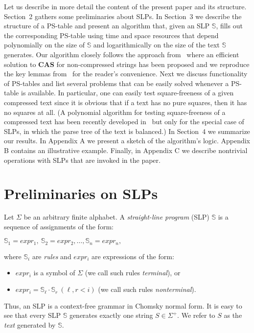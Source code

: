 \documentclass[11pt]{article}
\begin{document}
Let us describe in more detail the content of the present paper
and its structure. Section~2 gathers some preliminaries about
SLPs. In Section~3 we describe the structure of a PS-table and
present an algorithm that, given an SLP $\mathbb{S}$, fills out
the corresponding PS-table using time and space resources that
depend polynomially on the size of $\mathbb{S}$ and
logarithmically on the size of the text $\mathbb{S}$ generates.
Our algorithm closely follows the approach from~\cite{2} where an
efficient solution to {\bf CAS} for non-compressed strings has
been proposed and we reproduce the key lemmas from~\cite{2} for
the reader's convenience. Next we discuss functionality of
PS-tables and list several problems that can be easily solved
whenever a PS-table is available. In particular, one can easily
test square-freeness of a given compressed text since it is
obvious that if a text has no pure squares, then it has no squares
at all. (A polynomial algorithm for testing square-freeness of a
compressed text has been recently developed in~\cite{new} but only
for the special case of SLPs, in which the parse tree of the text
is balanced.) In Section~4 we summarize our results. In Appendix A
we present a sketch of the algorithm's logic. Appendix B contains
an illustrative example. Finally, in Appendix C we describe
nontrivial operations with SLPs that are invoked in the paper.

\section{Preliminaries on SLPs}

Let $\Sigma$ be an arbitrary finite alphabet. A \emph{straight-line program}
(SLP) $\mathbb{S}$ is a sequence of assignments of the form:

\begin{center}
$\mathbb{S}_1 = expr_1,\ \mathbb{S}_2 = expr_2, \dots, \mathbb{S}_n = expr_n,$
\end{center}
where $\mathbb{S}_i$ are \emph{rules} and $expr_i$ are expressions of the form:
\begin{itemize}
\item $expr_i$ is a symbol of $\Sigma$ (we call such rules \emph{terminal}), or
\item $expr_i = \mathbb{S}_\ell\cdot \mathbb{S}_r \ (\ell, r < i)$ (we call such rules \emph{nonterminal}).
\end{itemize}

Thus, an SLP is a context-free grammar in Chomsky normal form. It
is easy to see that every SLP $\mathbb{S}$ generates exactly one
string $S\in\Sigma^+$. We refer to $S$ as the \emph{text}
generated by $\mathbb{S}$.
\end{document}
